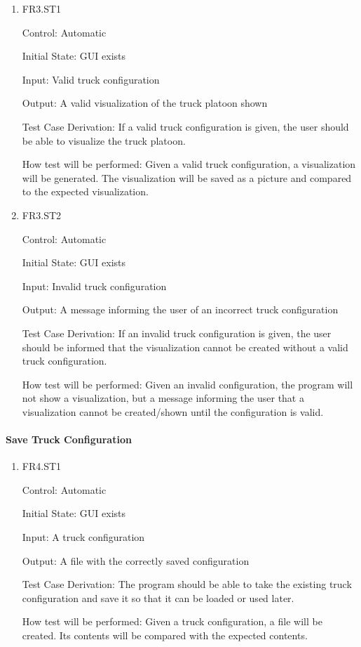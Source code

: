 \documentclass[12pt, titlepage]{article}
\begin{document}
\begin{enumerate}

  \item{FR3.ST1\\}

  Control: Automatic

  Initial State: GUI exists

  Input: Valid truck configuration

  Output: A valid visualization of the truck platoon shown

  Test Case Derivation: If a valid truck configuration is given, the user should be able to
  visualize the truck platoon.

  How test will be performed: Given a valid truck configuration, a visualization will be generated.
  The visualization will be saved as a picture and compared to the expected visualization.

  \item{FR3.ST2\\}

  Control: Automatic

  Initial State: GUI exists

  Input: Invalid truck configuration

  Output: A message informing the user of an incorrect truck configuration

  Test Case Derivation: If an invalid truck configuration is given, the user should be informed
  that the visualization cannot be created without a valid truck configuration.

  How test will be performed: Given an invalid configuration, the program will not show
  a visualization, but a message informing the user that a visualization cannot be created/shown
  until the configuration is valid.

\end{enumerate}

\paragraph{Save Truck Configuration}

\begin{enumerate}

  \item{FR4.ST1\\}

  Control: Automatic

  Initial State: GUI exists

  Input: A truck configuration

  Output: A file with the correctly saved configuration

  Test Case Derivation: The program should be able to take the existing truck configuration and
  save it so that it can be loaded or used later.

  How test will be performed: Given a truck configuration, a file will be created. Its contents
  will be compared with the expected contents.

\end{enumerate}
\end{document}
